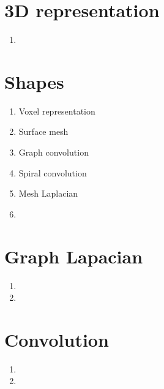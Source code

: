 \documentclass{article}
\begin{document}
	\section{3D representation}
	\begin{enumerate}
		\item 
	\end{enumerate}
	\section{Shapes}
	\begin{enumerate}
		\item Voxel representation
		\item Surface mesh
		\item Graph convolution
		\item Spiral convolution
		\item Mesh Laplacian
		\item 
	\end{enumerate}
	\section{Graph Lapacian}
	\begin{enumerate}
		\item 
		\item 
	\end{enumerate}
	\section{Convolution}
	\begin{enumerate}
		\item 
		\item 
	\end{enumerate}
\end{document}
